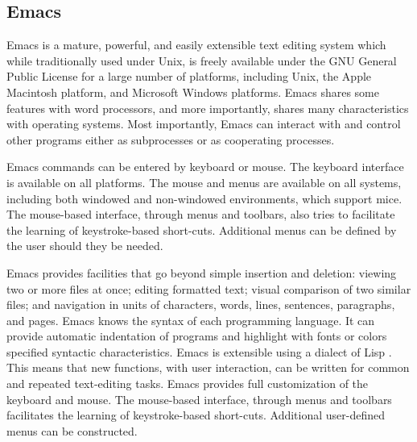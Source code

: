 \documentclass{article}
\begin{document}
\subsection{Emacs}
\label{sec:intro:emacs}

Emacs \citep{RMS:2000} is a mature, powerful, and easily extensible
text editing system which while traditionally used under Unix, is
freely available under the GNU General Public License for a large
number of platforms, including Unix, the Apple Macintosh platform, and
Microsoft Windows platforms.  Emacs shares some features with word
processors, and more importantly, shares many characteristics with
operating systems.  Most importantly, Emacs can interact with and
control other programs either as subprocesses or as cooperating
processes.

Emacs commands can be entered by keyboard or mouse.  The keyboard
interface is available on all platforms.  The mouse and menus are
available on all systems, including both windowed and non-windowed
environments, which support mice.  The mouse-based interface, through
menus and toolbars, also tries to facilitate the learning of
keystroke-based short-cuts.  Additional menus can be defined by the
user should they be needed.


Emacs provides facilities that go beyond simple insertion and
deletion: viewing two or more files at once; editing formatted text;
visual comparison of two similar files; and navigation in units of
characters, words, lines, sentences, paragraphs, and pages.  Emacs
knows the syntax of each programming language.  It can provide
automatic indentation of programs and highlight with fonts or colors
specified syntactic characteristics.  Emacs is extensible using a
dialect of Lisp \citep{RChassell1999,PGraham:1996}.  This means that
new functions, with user interaction, can be written for common and
repeated text-editing tasks.  Emacs provides full customization of the
keyboard and mouse.  The mouse-based interface, through menus and
toolbars facilitates the learning of keystroke-based short-cuts.
Additional user-defined menus can be constructed.
\end{document}

